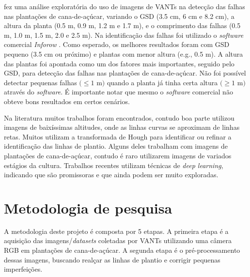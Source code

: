 \documentclass[12pt, a4paper, english, brazil]{article}
\newcommand{\textRed}[1]{{{\color{red} #1}}}
\newcommand{\linePage}{--------------------------------------------------------------------------------------------------------------}
\begin{document}


 fez uma análise exploratória do uso de imagens de VANTs na detecção das falhas nas plantações de cana-de-açúcar, variando o GSD (3.5 cm, 6 cm e 8.2 cm), a altura da planta (0.5 m, 0.9 m, 1.2 m e 1.7 m), e o comprimento das falhas (0.5 m, 1.0 m, 1.5 m, 2.0 e 2.5 m). Na identificação das falhas foi utilizado o \textit{software} comercial \textit{Inforow} \cite{Inforow_2021}. Como esperado, os melhores resultados foram com GSD pequeno (3.5 cm ou próximo) e plantas com menor altura (e.g., 0.5 m). A altura das plantas foi apontada como um dos fatores mais importantes, seguido pelo GSD, para detecção das falhas nas plantações de cana-de-açúcar. Não foi possível detectar pequenas falhas $(\le 1$ m$)$ quando a planta já tinha certa altura $(\ge 1$ m$)$ através do \textit{software}. É importante notar que mesmo o \textit{software} comercial não obteve bons resultados em certos cenários.




Na literatura muitos trabalhos foram encontrados, contudo boa parte utilizou imagens de baixíssimas altitudes, onde as linhas curvas se aproximam de linhas retas. Muitos utilizam a transformada de Hough para identificar ou refinar a identificação das linhas de plantio. Alguns deles trabalham com imagens de plantações de cana-de-açúcar, contudo é raro utilizarem imagens de variados estágios da cultura. Trabalhos recentes utilizam técnicas de \textit{deep learning}, indicando que são promissoras e que ainda podem ser muito exploradas.

\section{Metodologia de pesquisa}

A metodologia deste projeto é composta por 5 etapas. A primeira etapa é a aquisição das imagens/\textit{datasets} coletadas por VANTs utilizando uma câmera RGB em plantações de cana-de-açúcar. A segunda etapa é o pré-processamento dessas imagens, buscando realçar as linhas de plantio e corrigir pequenas imperfeições.
\end{document}
